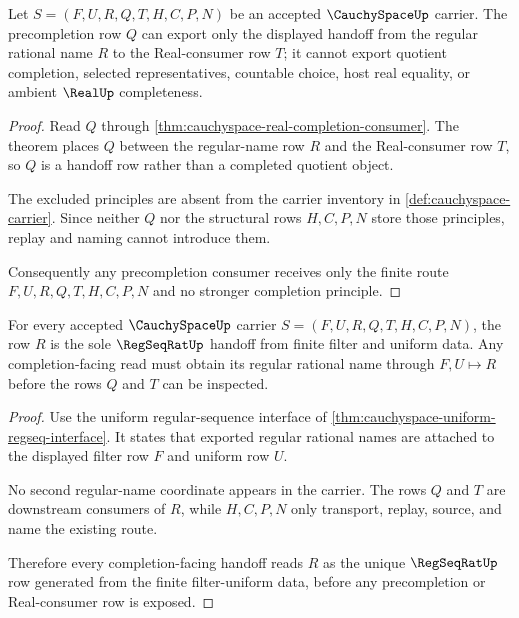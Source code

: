 \begin{theorem}
\label{thm:cauchyspace-precompletion-nonescape-obligation}
Let $S=(F,U,R,Q,T,H,C,P,N)$ be an accepted $\CauchySpaceUp$ carrier. The precompletion row $Q$ can export only the displayed handoff from the regular rational name $R$ to the Real-consumer row $T$; it cannot export quotient completion, selected representatives, countable choice, host real equality, or ambient $\RealUp$ completeness.
\end{theorem}
\begin{proof}
Read $Q$ through \autoref{thm:cauchyspace-real-completion-consumer}. The theorem places $Q$ between the regular-name row $R$ and the Real-consumer row $T$, so $Q$ is a handoff row rather than a completed quotient object.

The excluded principles are absent from the carrier inventory in \autoref{def:cauchyspace-carrier}. Since neither $Q$ nor the structural rows $H,C,P,N$ store those principles, replay and naming cannot introduce them.

Consequently any precompletion consumer receives only the finite route $F,U,R,Q,T,H,C,P,N$ and no stronger completion principle.
\end{proof}

\begin{theorem}
\label{thm:cauchyspace-regular-name-handoff-obligation}
For every accepted $\CauchySpaceUp$ carrier $S=(F,U,R,Q,T,H,C,P,N)$, the row $R$ is the sole $\RegSeqRatUp$ handoff from finite filter and uniform data. Any completion-facing read must obtain its regular rational name through $F,U \longmapsto R$ before the rows $Q$ and $T$ can be inspected.
\end{theorem}
\begin{proof}
Use the uniform regular-sequence interface of \autoref{thm:cauchyspace-uniform-regseq-interface}. It states that exported regular rational names are attached to the displayed filter row $F$ and uniform row $U$.

No second regular-name coordinate appears in the carrier. The rows $Q$ and $T$ are downstream consumers of $R$, while $H,C,P,N$ only transport, replay, source, and name the existing route.

Therefore every completion-facing handoff reads $R$ as the unique $\RegSeqRatUp$ row generated from the finite filter-uniform data, before any precompletion or Real-consumer row is exposed.
\end{proof}

